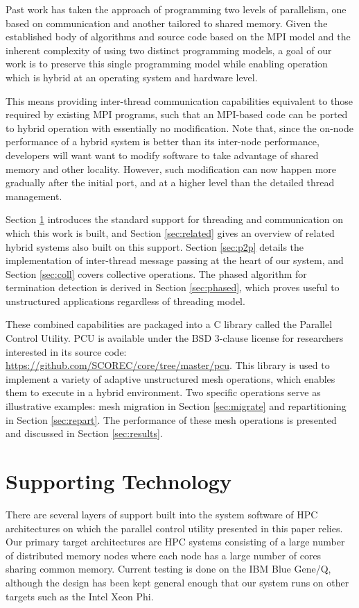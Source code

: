\documentclass[final,1p,times]{elsarticle}
\begin{document}
Past work has taken the approach of programming two levels of
parallelism, one based on communication and another tailored to shared memory.
Given the established body of algorithms and source code based on the MPI model
and the inherent complexity of using two distinct programming models,
a goal of our work is to preserve this single programming model while enabling
operation which is hybrid at an operating system and hardware level.

This means providing inter-thread communication capabilities equivalent to
those required by existing MPI programs, such that an MPI-based
code can be ported to hybrid operation with essentially no modification.
Note that, since the on-node performance of a hybrid system is better
than its inter-node performance, developers will want want to modify
software to take advantage of shared memory and other locality.
However, such modification can now happen more gradually after the initial
port, and at a higher level than the detailed thread management.

Section \ref{sec:thread} introduces the standard support for
threading and communication on which this work is built, and Section
\ref{sec:related} gives an overview of related hybrid systems also
built on this support.
Section \ref{sec:p2p} details the implementation of inter-thread message
passing at the heart of our system, and Section \ref{sec:coll} covers
collective operations.
The phased algorithm for termination detection is derived in Section
\ref{sec:phased}, which proves useful to unstructured applications
regardless of threading model.

These combined capabilities
are packaged into a C library called the Parallel Control Utility.
PCU is available under the BSD 3-clause license for researchers interested
in its source code: \url{https://github.com/SCOREC/core/tree/master/pcu}.
This library is used to implement a variety of adaptive unstructured
mesh operations, which enables them to execute in a hybrid environment.
Two specific operations serve as illustrative examples:
mesh migration in Section \ref{sec:migrate} and repartitioning in
Section \ref{sec:repart}.
The performance of these mesh operations is presented and discussed in
Section \ref{sec:results}.

\section{Supporting Technology}
\label{sec:thread}

There are several layers of support built into the system software 
of HPC architectures on which the parallel control utility
presented in this paper relies.
Our primary target architectures are
HPC systems consisting of a large number of distributed memory nodes
where each node has a large number of cores sharing common memory.
Current testing is done on the IBM Blue Gene/Q, although
the design has been kept general enough that our system runs
on other targets such as the Intel Xeon Phi.
\end{document}

